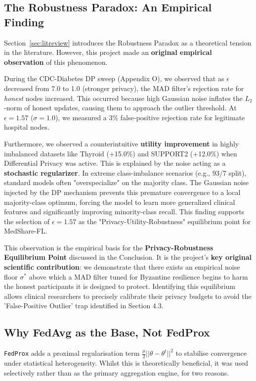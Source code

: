 \documentclass[10pt, a4paper, twocolumn]{article}
\begin{document}
\subsection{The Robustness Paradox: An Empirical Finding}
Section~\ref{sec:litreview} introduces the Robustness Paradox as a theoretical tension in the literature. However, this project made an \textbf{original empirical observation} of this phenomenon.

During the CDC-Diabetes DP sweep (Appendix O), we observed that as $\epsilon$ decreased from 7.0 to 1.0 (stronger privacy), the MAD filter's rejection rate for \textit{honest} nodes increased. This occurred because high Gaussian noise inflates the $L_2$-norm of honest updates, causing them to approach the outlier threshold. At $\epsilon = 1.57$ ($\sigma = 1.0$), we measured a 3\% false-positive rejection rate for legitimate hospital nodes.

Furthermore, we observed a counterintuitive \textbf{utility improvement} in highly imbalanced datasets like Thyroid (+15.0\%) and SUPPORT2 (+12.0\%) when Differential Privacy was active. This is explained by the noise acting as a \textbf{stochastic regularizer}. In extreme class-imbalance scenarios (e.g., 93/7 split), standard models often "overspecialize" on the majority class. The Gaussian noise injected by the DP mechanism prevents this premature convergence to a local majority-class optimum, forcing the model to learn more generalized clinical features and significantly improving minority-class recall. This finding supports the selection of $\epsilon=1.57$ as the "Privacy-Utility-Robustness" equilibrium point for MedShare-FL.

This observation is the empirical basis for the \textbf{Privacy-Robustness Equilibrium Point} discussed in the Conclusion. It is the project's \textbf{key original scientific contribution}: we demonstrate that there exists an empirical noise floor $\sigma^*$ above which a MAD filter tuned for Byzantine resilience begins to harm the honest participants it is designed to protect. Identifying this equilibrium allows clinical researchers to precisely calibrate their privacy budgets to avoid the 'False-Positive Outlier' trap identified in Section 4.3.

\subsection{Why FedAvg as the Base, Not FedProx}
\texttt{FedProx} \cite{li2020} adds a proximal regularisation term $\frac{\mu}{2}||\theta - \theta^t||^2$ to stabilise convergence under statistical heterogeneity. Whilst this is theoretically beneficial, it was used selectively rather than as the primary aggregation engine, for two reasons.
\end{document}
